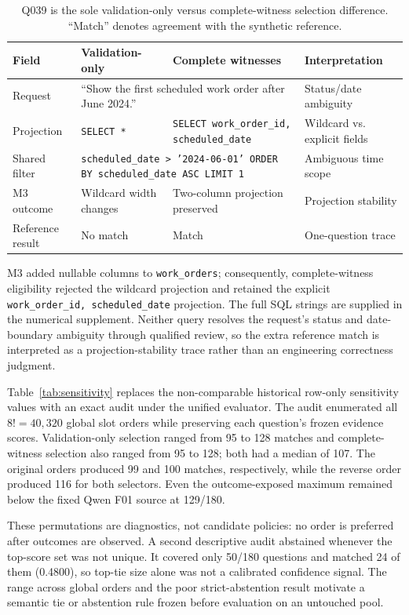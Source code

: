 \documentclass[information,article,submit,moreauthors]{Definitions/mdpi}
\begin{document}
\begin{table}[htbp]
\caption{Q039 is the sole validation-only versus complete-witness selection difference. ``Match'' denotes agreement with the synthetic reference.}
\label{tab:q039}
\centering
\footnotesize
\setlength{\tabcolsep}{3pt}
\begin{tabular}{p{2.2cm}p{4.0cm}p{4.0cm}p{1.8cm}}
\toprule
Field & Validation-only & Complete witnesses & Interpretation\\
\midrule
Request & \multicolumn{2}{p{8.8cm}}{``Show the first scheduled work order after June 2024.''} & Status/date ambiguity\\
Projection & \texttt{SELECT *} & \texttt{SELECT work\_order\_id, scheduled\_date} & Wildcard vs. explicit fields\\
Shared filter & \multicolumn{2}{p{8.8cm}}{\texttt{scheduled\_date > '2024-06-01' ORDER BY scheduled\_date ASC LIMIT 1}} & Ambiguous time scope\\
M3 outcome & Wildcard width changes & Two-column projection preserved & Projection stability\\
Reference result & No match & Match & One-question trace\\
\bottomrule
\end{tabular}
\end{table}

M3 added nullable columns to \texttt{work\_orders}; consequently, complete-witness eligibility rejected the wildcard projection and retained the explicit \texttt{work\_order\_id, scheduled\_date} projection. The full SQL strings are supplied in the numerical supplement. Neither query resolves the request's status and date-boundary ambiguity through qualified review, so the extra reference match is interpreted as a projection-stability trace rather than an engineering correctness judgment.

Table~\ref{tab:sensitivity} replaces the non-comparable historical row-only sensitivity values with an exact audit under the unified evaluator. The audit enumerated all $8!=40{,}320$ global slot orders while preserving each question's frozen evidence scores. Validation-only selection ranged from 95 to 128 matches and complete-witness selection also ranged from 95 to 128; both had a median of 107. The original orders produced 99 and 100 matches, respectively, while the reverse order produced 116 for both selectors. Even the outcome-exposed maximum remained below the fixed Qwen F01 source at 129/180.

These permutations are diagnostics, not candidate policies: no order is preferred after outcomes are observed. A second descriptive audit abstained whenever the top-score set was not unique. It covered only 50/180 questions and matched 24 of them (0.4800), so top-tie size alone was not a calibrated confidence signal. The range across global orders and the poor strict-abstention result motivate a semantic tie or abstention rule frozen before evaluation on an untouched pool.
\end{document}
